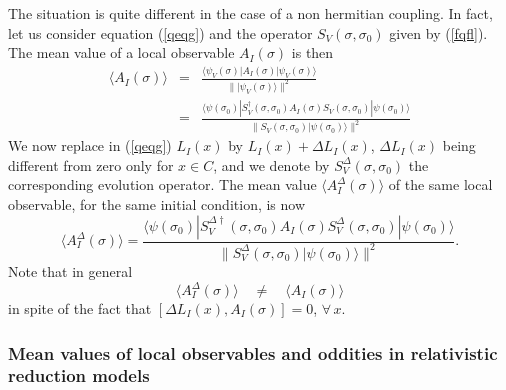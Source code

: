 \documentclass[10pt,a4paper]{article}
\begin{document}
The situation is quite different in the case of a non hermitian
coupling. In fact, let us consider equation (\ref{qeqg}) and the
operator $S_{V}(\sigma, \sigma_{0})$ given by (\ref{fqfl}). The
mean value of a local observable $A_{I}(\sigma)$ is then
\begin{eqnarray}
\langle A_{I}(\sigma) \rangle & = & \frac{\langle
\psi_{V}(\sigma)| A_{I}(\sigma) | \psi_{V}(\sigma) \rangle}{
\| |\psi_{V}(\sigma)\rangle \|^{2}} \nonumber \\
& = & \frac{\langle \psi(\sigma_{0})| S_{V}^{\dagger}(\sigma,
\sigma_{0}) A_{I}(\sigma) S_{V}(\sigma, \sigma_{0}) |
\psi(\sigma_{0}) \rangle}{ \| S_{V}(\sigma, \sigma_{0})
|\psi(\sigma_{0})\rangle \|^{2}}
\end{eqnarray}
We now replace in (\ref{qeqg}) $L_{I}(x)$ by $L_{I}(x) + \Delta
L_{I}(x)$, $\Delta L_{I}(x)$ being different from zero only for $x
\in C$, and we denote by $S_{V}^{\Delta}(\sigma, \sigma_{0})$ the
corresponding evolution operator. The mean value $\langle
A_{I}^{\Delta}(\sigma) \rangle$ of the same local observable, for
the same initial condition, is now
\begin{equation}
\langle A_{I}^{\Delta}(\sigma) \rangle = \frac{\langle
\psi(\sigma_{0})| S_{V}^{\Delta\dagger}(\sigma, \sigma_{0})
A_{I}(\sigma) S_{V}^{\Delta}(\sigma, \sigma_{0}) |
\psi(\sigma_{0}) \rangle}{ \| S_{V}^{\Delta}(\sigma, \sigma_{0})
|\psi(\sigma_{0})\rangle \|^{2}}.
\end{equation}
Note that in general
\begin{equation}
\langle A_{I}^{\Delta}(\sigma) \rangle \quad \neq \quad \langle
A_{I}(\sigma) \rangle
\end{equation}
in spite of the fact that $[\Delta L_{I}(x), A_{I}(\sigma)] = 0$,
$\forall\, x$.

\subsubsection{Mean values of local observables and oddities in
relativistic reduction models} \label{sec1023}
\end{document}
